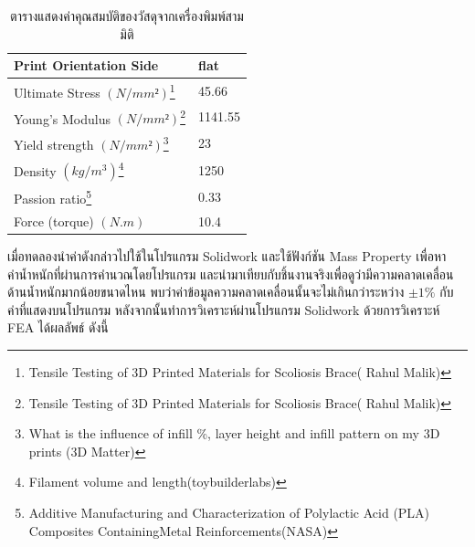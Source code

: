 \begin{table}[!ht]
	\centering
	\begin{tabular}{| l | l |}
		\hline
		Print Orientation Side	& flat \\
        \hline
        Ultimate Stress $(N/mm²)$\footnote{Tensile Testing of 3D Printed Materials for Scoliosis Brace( Rahul Malik)} & 	45.66 \\
        Young’s Modulus $(N/mm²)$\footnote{Tensile Testing of 3D Printed Materials for Scoliosis Brace( Rahul Malik)} & 	1141.55 \\
        Yield strength $(N/mm²)$\footnote{What is the influence of infill \%, layer height and infill pattern on my 3D prints (3D Matter)} & 23 \\
        Density $(kg/m^3)$\footnote{Filament volume and length(toybuilderlabs)} &	1250 \\
        Passion ratio\footnote{Additive Manufacturing and Characterization of Polylactic Acid (PLA) Composites ContainingMetal Reinforcements(NASA)} &	0.33 \\
        Force (torque) $(N.m)$ & 10.4 \\
	    \hline
	\end{tabular}
	\caption{ตารางแสดงค่าคุณสมบัติของวัสดุจากเครื่องพิมพ์สามมิติ}
	\label{tab:PLA_property}
\end{table}
\vspace{-15pt}
เมื่อทดลองนำค่าดังกล่าวไปใช้ในโปรแกรม Solidwork และใช้ฟังก์ชัน Mass Property เพื่อหาค่าน้ำหนักที่ผ่านการคำนวณโดยโปรแกรม
และนำมาเทียบกับชิ้นงานจริงเพื่อดูว่ามีความคลาดเคลื่อนด้านน้ำหนักมากน้อยขนาดไหน พบว่าค่าข้อมูลความคลาดเคลื่อนนั้นจะไม่เกินกว่าระหว่าง $\pm 1\%$ กับค่าที่แสดงบนโปรแกรม
หลังจากนั้นทำการวิเคราะห์ผ่านโปรแกรม Solidwork ด้วยการวิเคราะห์ FEA ได้ผลลัพธ์ ดังนี้

